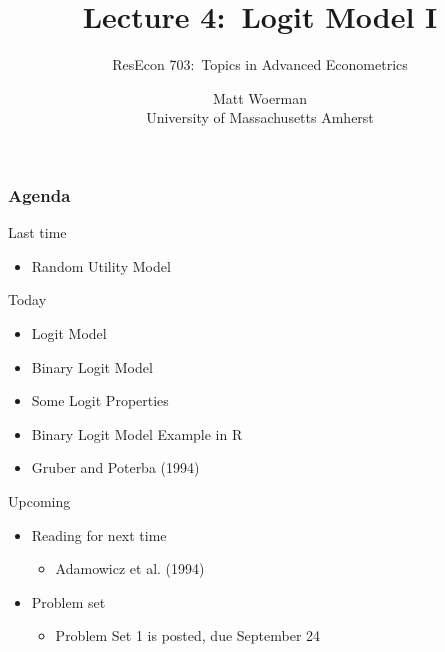 \documentclass{beamer}\usepackage[]{graphicx}\usepackage[]{color}
\title[Lecture 4:\ Logit Model I]{Lecture 4:\ Logit Model I}
\author[ResEcon 703:\ Advanced Econometrics]{ResEcon 703:\ Topics in Advanced Econometrics}
\date{Matt Woerman\\University of Massachusetts Amherst}
\begin{document}
{ 
\begin{frame}[noframenumbering]
    \titlepage
\end{frame}
}

\begin{frame}\frametitle{Agenda}
    Last time
    \begin{itemize}
        \item Random Utility Model
    \end{itemize}
    \vspace{2ex}
    Today
    \begin{itemize}
    	\item Logit Model
    	\item Binary Logit Model
    	\item Some Logit Properties
    	\item Binary Logit Model Example in R
    	\item Gruber and Poterba (1994)
    \end{itemize}
    \vspace{2ex}
    Upcoming
    \begin{itemize}
        \item Reading for next time
        \begin{itemize}
            \item Adamowicz et al. (1994)
        \end{itemize}
        \item Problem set
        \begin{itemize}
            \item Problem Set 1 is posted, due September 24
        \end{itemize}
    \end{itemize}
\end{frame}
\end{document}
